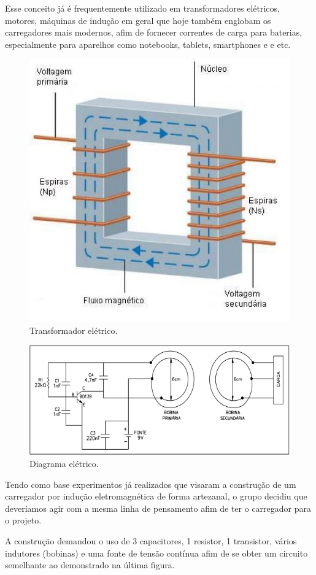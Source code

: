 Esse conceito já é frequentemente utilizado em transformadores elétricos, motores, máquinas de indução em geral que hoje também englobam os carregadores mais modernos, afim de fornecer correntes de carga para baterias, especialmente para aparelhos como notebooks, tablets, smartphones e  e etc.

 \begin{figure}[H]
	\centering
	\includegraphics[scale=0.5]{figuras/transformador}
	\caption{Transformador elétrico.}
	\label{img:transformador}
\end{figure}

 \begin{figure}[H]
	\centering
	\includegraphics[scale=0.5]{figuras/diagrama_eletrico}
	\caption{Diagrama elétrico.}
	\label{img:diagrama_eletrico}
\end{figure}

Tendo como base experimentos já realizados que visaram a construção de um carregador por indução eletromagnética de forma artezanal, o grupo decidiu que deveríamos agir com a mesma linha de pensamento afim de ter o carregador para o projeto.

A construção demandou o uso de 3 capacitores, 1 resistor, 1 transistor, vários indutores (bobinas) e uma fonte de tensão contínua afim de se obter um circuito semelhante ao demonstrado na última figura.


